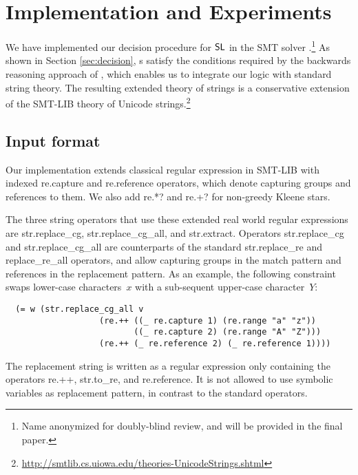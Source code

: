 
\section{Implementation and Experiments}
\label{sect:impl}

We have implemented our decision procedure for $\mathsf{SL}$ in the SMT
solver \ostrich.\footnote{Name anonymized for doubly-blind review,
and will be provided in the final paper.}
As shown in Section \ref{sec:decision},
\PSST s satisfy the conditions required by the backwards reasoning
approach of \ostrich, which enables us to integrate our logic with
standard string theory. The resulting extended theory of strings is a
conservative extension of the SMT-LIB theory of Unicode
strings.\footnote{\url{http://smtlib.cs.uiowa.edu/theories-UnicodeStrings.shtml}}

\subsection{Input format}

Our implementation extends classical regular expression in SMT-LIB
with indexed {\sf re.capture} and {\sf re.reference} operators, which
denote capturing groups and references to them. We also add {\sf re.*?}
and {\sf re.+?} for non-greedy Kleene stars.

The three string operators that use these extended real world regular
expressions are {\sf str.replace\_cg}, {\sf str.replace\_cg\_all}, and
{\sf str.extract}. Operators {\sf str.replace\_cg} and {\sf
  str.replace\_cg\_all} are counterparts of the standard {\sf
  str.replace\_re} and {\sf replace\_re\_all} operators, and allow
capturing groups in the match pattern and references in the
replacement pattern. As an example, the following constraint swaps
lower-case characters~$x$ with a sub-sequent upper-case character~$Y$:
%
\begin{verbatim}
  (= w (str.replace_cg_all v
                   (re.++ ((_ re.capture 1) (re.range "a" "z"))
                          ((_ re.capture 2) (re.range "A" "Z")))
                   (re.++ (_ re.reference 2) (_ re.reference 1))))
\end{verbatim}
%
The replacement string is written as a regular expression only
containing the operators {\sf re.++}, {\sf str.to\_re}, and {\sf
  re.reference}. It is not allowed to use symbolic variables as
replacement pattern, in contrast to the standard operators.


